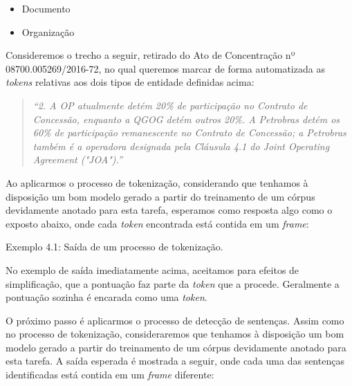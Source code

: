 \documentclass[11pt]{report}
\newcommand{\quotes}[1]{``#1''}
\begin{document}
\begin{itemize}
  \item Documento
  \item Organização
\end{itemize}

Consideremos o trecho a seguir, retirado do Ato de Concentração nº 08700.005269/2016-72, no qual queremos marcar de forma automatizada as \textit{tokens} relativas
aos dois tipos de entidade definidas acima:

\begin{quote}
  \textit{\quotes{2. A OP atualmente detém 20\% de participação no Contrato de Concessão, enquanto a QGOG detém outros 20\%.
  A Petrobras detém os 60\% de participação remanescente no Contrato de Concessão; a Petrobras também é a operadora designada
  pela Cláusula 4.1 do Joint Operating Agreement ("JOA").}}
\end{quote}

Ao aplicarmos o processo de tokenização, considerando que tenhamos à disposição um bom modelo gerado a partir do treinamento de um córpus devidamente anotado para esta tarefa,
esperamos como resposta algo como o exposto abaixo, onde cada \textit{token} encontrada está contida em um \textit{frame}:

\begin{quote}
             
       
              
       
         
\end{quote}
\begin{center}
  Exemplo 4.1: Saída de um processo de tokenização.
\end{center}

No exemplo de saída imediatamente acima, aceitamos para efeitos de simplificação, que a pontuação faz parte da \textit{token} que a procede.
Geralmente a pontuação sozinha é encarada como uma \textit{token}.

O próximo passo é aplicarmos o processo de detecção de sentenças. Assim como no processo de tokenização, consideraremos que tenhamos à disposição um bom modelo
gerado a partir do treinamento de um córpus devidamente anotado para esta tarefa. A saída esperada é mostrada a seguir, onde cada uma das sentenças identificadas está contida
em um \textit{frame} diferente:
\end{document}
